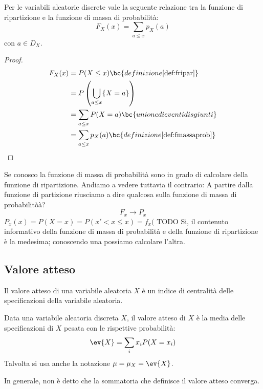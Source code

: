 \begin{prop}
	Per le variabili aleatorie discrete vale la seguente relazione tra la funzione di ripartizione e la funzione di massa di probabilità:
	\begin{equation*}
		F_X(x)=\sum_{a\leq x} p_X(a)
	\end{equation*}
	con $a\in D_X$.
\end{prop}
\begin{proof}
	\begin{align*}
		F_X(x) & = P(X\leq x)                             \bc{definizione \ref{def:fripar}}     \\
		       & = P\left(\bigcup_{a\leq x}\{X=a\}\right)                                       \\
		       & = \sum_{a\leq x} P(X=a)                  \bc{unione di eventi disgiunti}       \\
		       & = \sum_{a\leq x} p_X(a)                  \bc{definizione \ref{def:fmassaprob}}
	\end{align*}
\end{proof}
Se conosco la funzione di massa di probabilità sono in grado di calcolare della funzione di ripartizione. Andiamo a vedere tuttavia il contrario:
A partire dalla funzione di partizione riusciamo a dire qualcosa sulla funzione di massa di probabilitòà?
\begin{equation*}
	F_x \rightarrow P_x
	\end{equation*}
$P_x(x) = P(X = x) = P(x' < x \leq x)= f_x( $ TODO
Si, il contenuto informativo della funzione di massa di probabilità e della funzione di ripartizione è la medesima; conoscendo una possiamo calcolare l'altra.




\subsection{Valore atteso}
Il valore atteso di una variabile aleatoria $X$ è un indice di centralità delle specificazioni della variabile aleatoria.
\begin{defin} \label{def:valatt}
	Data una variabile aleatoria discreta $X$, il valore atteso di $X$ è la media delle specificazioni di $X$ pesata con le rispettive probabilità:
	\begin{equation*}
		\ev{X}=\sum_i x_i P(X=x_i)
	\end{equation*}
	Talvolta si usa anche la notazione $\mu=\mu_X=\ev{X}$.
\end{defin}
\noindent
In generale, non è detto che la sommatoria che definisce il valore atteso converga.

